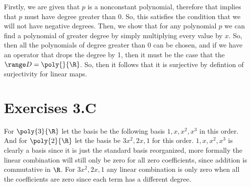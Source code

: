 \begin{q}[26]
    Firstly, we are given that $ p $ is a nonconstant polynomial, therefore that implies that $ p $ must have degree greater than 0. 
    So, this satisfies the condition that we will not have negative degrees. 
    Then, we show that for any polynomial $ p $ we can find a polynomial of greater degree by simply multiplying every value by $ x $. 
    So, then all the polynomials of degree greater than 0 can be chosen, and if we have an operator that drops the degree by 1, then it must be the case that 
    the $ \range D = \poly{}{\R} $. So, then it follows that it is surjective by defintion of surjectivity for linear maps.
\end{q}

\section{Exercises 3.C}
\begin{q}[2]
    For $ \poly{3}{\R} $ let the basis be the following basis $ 1, x, x^2, x^3 $ in this order. 
    And for $ \poly{2}{\R} $ let the basis be $ 3x^2, 2x, 1 $ for this order. 
    $ 1, x, x^2, x^3 $ is clearly a basis since it is just the standard basis reorganized, more formally the linear combination will still only be zero for all zero coefficients, since addition is commutative in $ \R $. 
    For  $ 3x^2, 2x, 1 $ any linear combination is only zero when all the coefficients are zero since each term has a different degree. 
\end{q}
